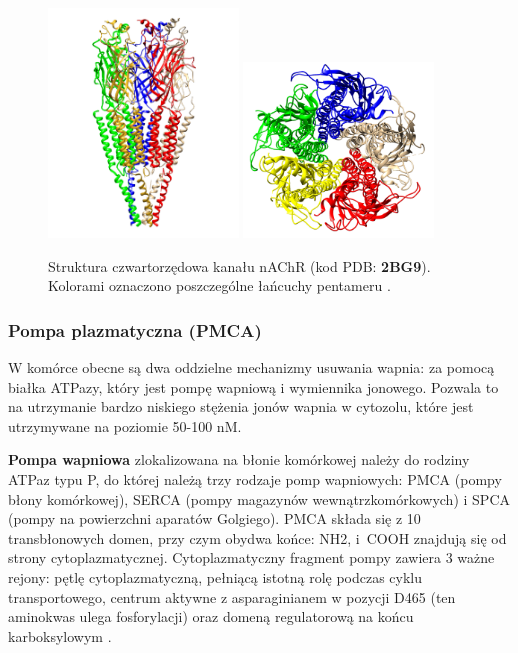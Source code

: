 \begin{figure}[tb]
\centering
\includegraphics[width=0.45\textwidth]{rysunki/rozdzial_1/2bg9nAChRside.png}%
\includegraphics[width=0.45\textwidth]{rysunki/rozdzial_1/2bg9nAChR.png}%
\caption [Struktura kanału nAChR]{Struktura czwartorzędowa kanału nAChR (kod PDB: \textbf{2BG9}). Kolorami oznaczono poszczególne łańcuchy pentameru \cite{Unwin2005}.}
\label{fig:nachr}
\end{figure}

\FloatBarrier
\subsubsection{Pompa plazmatyczna (PMCA)}\label{sss:PMCA}

W komórce obecne są dwa oddzielne mechanizmy usuwania wapnia: za pomocą białka ATPazy, który jest pompę wapniową i wymiennika jonowego. Pozwala to na utrzymanie bardzo niskiego stężenia jonów wapnia w cytozolu, które jest utrzymywane na poziomie 50-100 nM.

\textbf{Pompa wapniowa} zlokalizowana na błonie komórkowej należy do rodziny \mbox{ATPaz} typu P, do której należą trzy rodzaje pomp wapniowych: PMCA (pompy błony komórkowej), SERCA (pompy magazynów wewnątrzkomórkowych) i SPCA (pompy na powierzchni aparatów Golgiego). PMCA składa się z 10 transbłonowych domen, przy czym obydwa końce: NH2, i~COOH znajdują się od strony cytoplazmatycznej. Cytoplazmatyczny fragment pompy zawiera 3 ważne rejony: pętlę cytoplazmatyczną, pełniącą istotną rolę podczas cyklu transportowego, centrum aktywne z asparaginianem w pozycji D465 (ten aminokwas ulega fosforylacji) oraz domeną regulatorową na końcu karboksylowym \cite{DiLeva2008,Guerini2005}.

